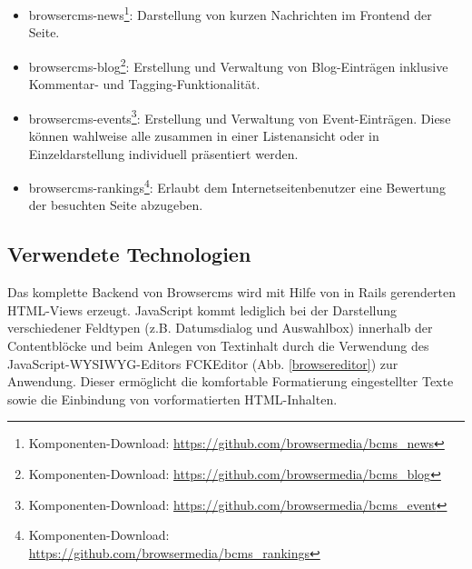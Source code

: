 \begin{itemize}
\item browsercms-news\footnote{Komponenten-Download: \href{https://github.com/browsermedia/bcms\_news}{https://github.com/browsermedia/bcms\_news}}: Darstellung von kurzen Nachrichten im Frontend der Seite.
\item browsercms-blog\footnote{Komponenten-Download: \href{https://github.com/browsermedia/bcms\_blog}{https://github.com/browsermedia/bcms\_blog}}: Erstellung und Verwaltung von Blog-Einträgen inklusive Kommentar- und Tagging-Funktionalität.
\item browsercms-events\footnote{Komponenten-Download: \href{https://github.com/browsermedia/bcms\_event}{https://github.com/browsermedia/bcms\_event}}: Erstellung und Verwaltung von Event-Einträgen. Diese können wahlweise alle zusammen in einer Listenansicht oder in Einzeldarstellung individuell präsentiert werden.
\item browsercms-rankings\footnote{Komponenten-Download: \href{https://github.com/browsermedia/bcms\_rankings}{https://github.com/browsermedia/bcms\_rankings}}: Erlaubt dem Internetseitenbenutzer eine Bewertung der besuchten Seite abzugeben.
\end{itemize}

\subsection{Verwendete Technologien}

Das komplette Backend von Browsercms wird mit Hilfe von in Rails gerenderten HTML-Views erzeugt. JavaScript kommt lediglich bei der Darstellung verschiedener Feldtypen (z.B. Datumsdialog und Auswahlbox) innerhalb der Contentblöcke und beim Anlegen von Textinhalt durch die Verwendung des JavaScript-WYSIWYG-Editors FCKEditor (Abb. \ref{browsereditor}) zur Anwendung. Dieser ermöglicht die komfortable Formatierung eingestellter Texte sowie die Einbindung von vorformatierten HTML-Inhalten.

